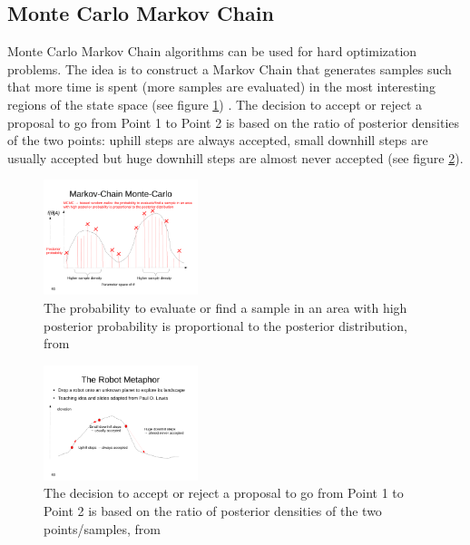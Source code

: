 \subsection{Monte Carlo Markov Chain} \label{sec:MCMC}

Monte Carlo Markov Chain algorithms can be used for hard optimization problems. The idea is to construct a Markov Chain that generates samples such that more time is spent (more samples are evaluated) in the most interesting regions of the state space (see figure \ref{fig:MCMC1}) \cite{MCMC}. The decision to accept or reject a proposal to go from Point 1 to Point 2 is based on the ratio of posterior densities of the two points: uphill steps are always accepted, small downhill steps are usually accepted but huge downhill steps are almost never accepted (see figure \ref{fig:MCMC2}). 


\begin{figure}
	\begin{center}
		\includegraphics[trim = 0cm 1.5cm 1cm 5.4cm, clip, width=0.4\textwidth]{lecture12-seiten-46}
	\end{center}
	\caption{The probability to evaluate or find a sample in an area with high posterior probability is proportional to the posterior distribution, from \cite{MCMC}}
	\label{fig:MCMC1}
\end{figure}

\begin{figure}
	\begin{center}
		\includegraphics[trim = 0cm 4cm 1cm 7cm, clip, width=0.4\textwidth]{lecture12-seiten-48}
	\end{center}
	\caption{The decision to accept or reject a proposal to go from Point 1 to Point 2 is based on the ratio of posterior densities of the two points/samples, from \cite{MCMC}}
	\label{fig:MCMC2}
\end{figure}